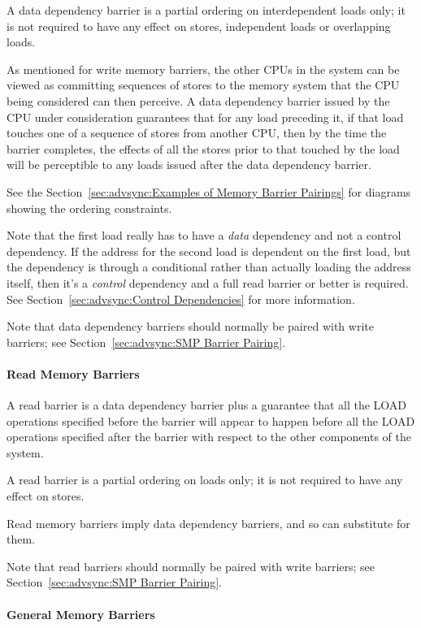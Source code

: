 A data dependency barrier is a partial ordering on interdependent loads
only; it is not required to have any effect on stores, independent loads
or overlapping loads.

As mentioned for write memory barriers,
the other CPUs in the system can be viewed as
committing sequences of stores to the memory system that the CPU being
considered can then perceive.  A data dependency barrier issued by the CPU
under consideration guarantees that for any load preceding it, if that
load touches one of a sequence of stores from another CPU, then by the
time the barrier completes, the effects of all the stores prior to that
touched by the load will be perceptible to any loads issued after the data
dependency barrier.

See the Section~\ref{sec:advsync:Examples of Memory Barrier Pairings} for
diagrams showing the ordering constraints.

Note that the first load really has to have a
\emph{data} dependency and
not a control dependency.  If the address for the second load is dependent
on the first load, but the dependency is through a conditional rather than
actually loading the address itself, then it's a \emph{control} dependency and
a full read barrier or better is required.  See
Section~\ref{sec:advsync:Control Dependencies} for more information.

Note that data dependency barriers should normally be paired with
write barriers; see Section~\ref{sec:advsync:SMP Barrier Pairing}.

\paragraph{Read Memory Barriers}

A read barrier is a data dependency barrier plus a guarantee that all the
LOAD operations specified before the barrier will appear to happen before
all the LOAD operations specified after the barrier with respect to the
other components of the system.

A read barrier is a partial ordering on loads only; it is not required to
have any effect on stores.

Read memory barriers imply data dependency barriers, and so can substitute
for them.

Note that read barriers should normally be paired with write barriers;
see Section~\ref{sec:advsync:SMP Barrier Pairing}.

\paragraph{General Memory Barriers}

